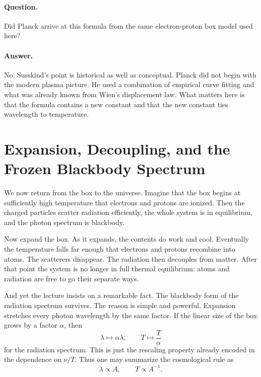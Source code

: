 \paragraph{Question.} Did Planck arrive at this formula from the same electron-proton box model used here?

\paragraph{Answer.} No. Susskind's point is historical as well as conceptual. Planck did not begin with the modern plasma picture. He used a combination of empirical curve fitting and what was already known from Wien's displacement law. What matters here is that the formula contains a new constant and that the new constant ties wavelength to temperature.

\section{Expansion, Decoupling, and the Frozen Blackbody Spectrum}

We now return from the box to the universe. Imagine that the box begins at sufficiently high temperature that electrons and protons are ionized. Then the charged particles scatter radiation efficiently, the whole system is in equilibrium, and the photon spectrum is blackbody.

Now expand the box. As it expands, the contents do work and cool. Eventually the temperature falls far enough that electrons and protons recombine into atoms. The scatterers disappear. The radiation then decouples from matter. After that point the system is no longer in full thermal equilibrium: atoms and radiation are free to go their separate ways.

And yet the lecture insists on a remarkable fact. The blackbody form of the radiation spectrum survives. The reason is simple and powerful. Expansion stretches every photon wavelength by the same factor. If the linear size of the box grows by a factor \(\alpha\), then
\begin{equation}
\lambda \mapsto \alpha \lambda,
\qquad
T \mapsto \frac{T}{\alpha}
\end{equation}
for the radiation spectrum. This is just the rescaling property already encoded in the dependence on \(\nu/T\). Thus one may summarize the cosmological rule as
\begin{equation}
\lambda \propto A,
\qquad
T \propto A^{-1}.
\end{equation}

